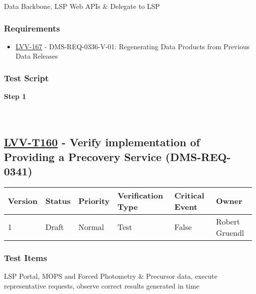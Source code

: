 Data Backbone, LSP Web APIs \& Delegate to LSP

\hypertarget{requirements-59}{%
\subsubsection{Requirements}\label{requirements-59}}

\begin{itemize}
\tightlist
\item
  \href{https://jira.lsstcorp.org/browse/LVV-167}{LVV-167} -
  DMS-REQ-0336-V-01: Regenerating Data Products from Previous Data
  Releases
\end{itemize}

\hypertarget{test-script-59}{%
\subsubsection{Test Script}\label{test-script-59}}

\textbf{Step 1}\\
~\\
~\\

\hypertarget{lvv-t160---verify-implementation-of-providing-a-precovery-service-dms-req-0341}{%
\subsection{\texorpdfstring{\href{https://jira.lsstcorp.org/secure/Tests.jspa\#/testCase/LVV-T160}{LVV-T160}
- Verify implementation of Providing a Precovery Service
(DMS-REQ-0341)}{LVV-T160 - Verify implementation of Providing a Precovery Service (DMS-REQ-0341)}}\label{lvv-t160---verify-implementation-of-providing-a-precovery-service-dms-req-0341}}

\begin{longtable}[]{@{}llllll@{}}
\toprule
Version & Status & Priority & Verification Type & Critical Event &
Owner\tabularnewline
\midrule
\endhead
1 & Draft & Normal & Test & False & Robert Gruendl\tabularnewline
\bottomrule
\end{longtable}

\hypertarget{test-items-60}{%
\subsubsection{Test Items}\label{test-items-60}}

LSP Portal, MOPS and Forced Photometry \& Precursor data, execute
representative requests, observe correct results generated in time

